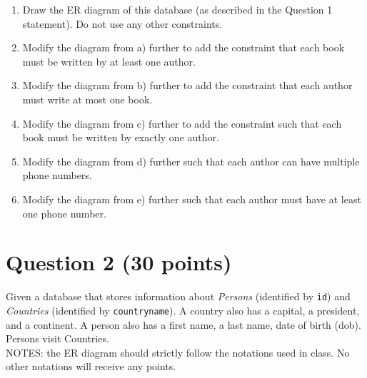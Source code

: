 \documentclass[letterpaper, 11pt]{article}
\begin{document}
\begin{enumerate}[label={\alph*})]
    \item Draw the ER diagram of this database (as described in the Question 1 statement). Do not use any other constraints.
    \item Modify the diagram from a) further to add the constraint that each book must be written by at least one author.
    \item Modify the diagram from b) further to add the constraint that each author must write at most one book.
    \item Modify the diagram from c) further to add the constraint such that each book must be written by exactly one author.
    \item Modify the diagram from d) further such that each author can have multiple phone numbers.
    \item Modify the diagram from e) further such that each author must have at least one phone number.
\end{enumerate}

\section*{Question 2 (30 points)}

Given a database that stores information about \textit{Persons} (identified by \texttt{id}) and \textit{Countries} (identified by \texttt{countryname}). A country also has a capital, a president, and a continent. A person also has a first name, a last name, date of birth (dob). Persons visit Countries.\\
NOTES: the ER diagram should strictly follow the notations used in class. No other notations will receive any points.
\end{document}
